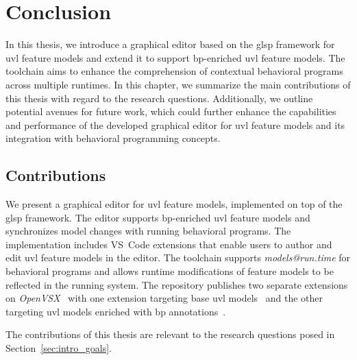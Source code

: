 \chapter{Conclusion}
\label{chapter:conclusion}

In this thesis, we introduce a graphical editor based on the \gls{glsp} framework for \gls{uvl} feature models and extend it to support \gls{bp}-enriched \gls{uvl} feature models.
The toolchain aims to enhance the comprehension of contextual behavioral programs across multiple runtimes. 
In this chapter, we summarize the main contributions of this thesis with regard to the research questions.
Additionally, we outline potential avenues for future work, which could further enhance the capabilities and performance of the developed graphical editor for \gls{uvl} feature models and its integration with behavioral programming concepts.

\section{Contributions}
\label{sec:conclusion_contributions}

We present a graphical editor for \gls{uvl} feature models, implemented on top of the \gls{glsp} framework.
The editor supports \gls{bp}-enriched \gls{uvl} feature models and synchronizes model changes with running behavioral programs.
The implementation includes VS~Code extensions that enable users to author and edit \gls{uvl} feature models in the editor.
The toolchain supports \textit{models@run.time} for behavioral programs and allows runtime modifications of feature models to be reflected in the running system.
The repository publishes two separate extensions on \textit{OpenVSX}~\cite{efftinge_eclipse_2020} with one extension targeting base \gls{uvl} models~\cite{ruider_uvl_nodate} and the other targeting \gls{uvl} models enriched with \gls{bp} annotations~\cite{ruider_uvlbp_nodate}.

The contributions of this thesis are relevant to the research questions posed in Section~\ref{sec:intro_goals}.

